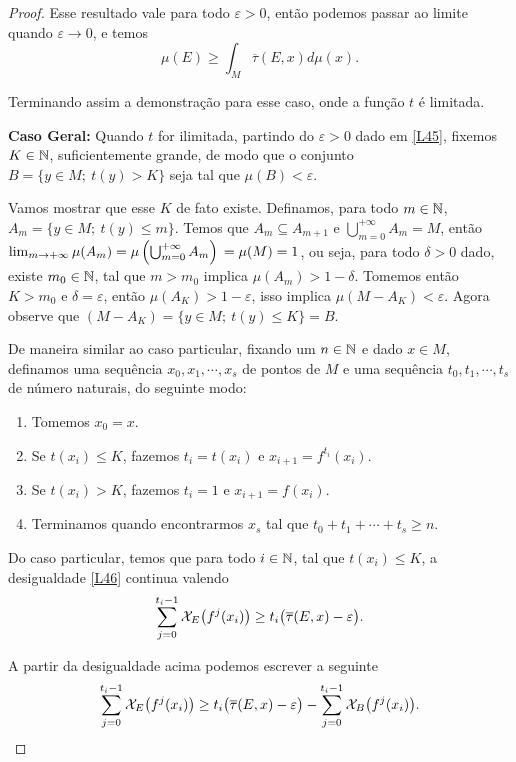 \begin{proof}
Esse resultado vale para todo $\varepsilon>0$, então podemos passar ao limite quando $\varepsilon\to0$, e temos
\begin{equation*}
\mu(E)\geq\int_{M}\overline{\tau}(E,x)d\mu(x).
\end{equation*}

Terminando assim a demonstração para esse caso, onde a função $t$ é limitada.

\textbf{Caso Geral:} Quando $t$ for ilimitada, partindo do $\varepsilon>0$ dado em \eqref{L45}, fixemos $K\in\mathbb{N}$, suficientemente grande, de modo que o conjunto $B=\big\{y\in M;\ t(y)>K\big\}$ seja tal que $\mu(B)<\varepsilon$. 

Vamos mostrar que esse $K$ de fato existe. Definamos, para todo $m\in \mathbb{N}$, $A_m=\big\{y\in M;\ t(y)\leq m\big\}$. Temos que $A_m\subseteq A_{m+1}$ e $\bigcup_{m=0}^{+\infty}A_m=M$, então $\lim_{m\to+\infty}\mu(A_m)=\mu\left(\bigcup_{m=0}^{+\infty}A_m\right)\\ = \mu(M)=1$, ou seja, para todo $\delta>0$ dado, existe $m_0\in\mathbb{N}$, tal que $m>m_0$ implica $\mu(A_m)>1-\delta$. Tomemos então $K>m_0$ e $\delta=\varepsilon$, então $\mu(A_K)>1-\varepsilon$, isso implica $\mu(M-A_K)<\varepsilon$. Agora observe que $(M-A_K)=\big\{y\in M;\ t(y)\leq K\big\}=B$. 

De maneira similar ao caso particular, fixando um $n\in\mathbb{N}$ e dado $x \in M$, definamos uma sequência $x_0,x_1,\cdots,x_s$ de pontos de $M$ e uma sequência $t_0,t_1,\cdots,t_s$ de número naturais, do seguinte modo:

\begin{enumerate}
\item Tomemos $x_0=x$.
\item Se $t(x_i)\leq K$, fazemos $t_i=t(x_i)$ e $x_{i+1}=f^{t_i}(x_i)$.
\item Se $t(x_i)> K$, fazemos $t_i=1$ e $x_{i+1}=f(x_i)$.
\item Terminamos quando encontrarmos $x_s$ tal que $t_0+t_1+\cdots+t_s\geq n$.
\end{enumerate}

Do caso particular, temos que para todo $i\in\mathbb{N}$, tal que $t(x_i)\leq K$, a desigualdade \eqref{L46} continua valendo
\begin{equation}\label{L47}
\sum_{j=0}^{t_i-1}\mathcal{X}_{E}\big(f^j(x_i)\big)\geq t_i\big(\overline{\tau}(E,x)-\varepsilon\big).
\end{equation}

A partir da desigualdade acima podemos escrever a seguinte
\begin{equation}\label{L48}
\sum_{j=0}^{t_i-1}\mathcal{X}_{E}\big(f^j(x_i)\big)\geq t_i\big(\overline{\tau}(E,x)-\varepsilon\big)-\sum_{j=0}^{t_i-1}\mathcal{X}_{B}\big(f^j(x_i)\big).
\end{equation}


\end{proof}
